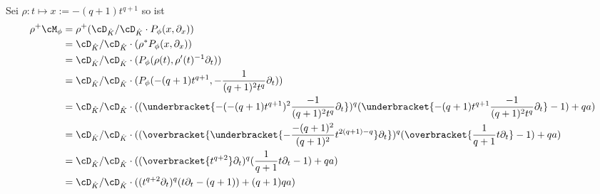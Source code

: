 Sei $\rho:t\mapsto x:=-(q+1) t^{q+1}$ so ist
\begin{align*}
\rho^+\cM_\phi &= \rho^+(\cD_{\hat K}/\cD_{\hat K}\cdot P_\phi(x,\partial_x))\\
  &=\cD_{\hat K}/\cD_{\hat K}\cdot(\rho^*P_\phi(x,\partial_x))\\
  &=\cD_{\hat K}/\cD_{\hat K}\cdot(P_\phi(\rho(t),\rho'(t)^{-1}\partial_t))\\
  &=\cD_{\hat K}/\cD_{\hat K}
    \cdot(P_\phi(-(q+1) t^{q+1},-\frac{1}{(q+1)^2t^q}\partial_t))\\
  &=\cD_{\hat K}/\cD_{\hat K} \cdot
    ((\underbracket{-(-(q+1) t^{q+1})^2\frac{-1}{(q+1)^2t^{q}}\partial_t})^{q}
    (\underbracket{-(q+1) t^{q+1}\frac{-1}{(q+1)^2t^{q}}\partial_t}-1)+qa)\\
  &=\cD_{\hat K}/\cD_{\hat K}
    \cdot((\overbracket{
      \underbracket{-\frac{-(q+1)^2}{(q+1)^2}t^{2(q+1)-q}}\partial_t})^{q}
    (\overbracket{\frac{1}{q+1}t\partial_t}-1)+qa)\\
  &=\cD_{\hat K}/\cD_{\hat K}
    \cdot((\overbracket{t^{q+2}}\partial_t)^{q}
    (\frac{1}{q+1}t\partial_t-1)+qa)\\
  &=\cD_{\hat K}/\cD_{\hat K}
    \cdot((t^{q+2}\partial_t)^{q}
    (t\partial_t-(q+1))+(q+1)qa)
\end{align*}
\begin{comment}
muss noch gezeigt werden, dass dies ein Meromorpher Zusammenhang???
\end{comment}
\begin{comment}
Bei \cite{sabbah_Fourier-local}:\\
Sei $\rho:t\mapsto x:=-\frac{t^{q+1}}{qa}$ so ist
\begin{align*}
\rho^+\cM_\phi &= \rho^+(\cD_{\hat K}/\cD_{\hat K}\cdot P_\phi(x,\partial_x))\\
  &=\cD_{\hat K}/\cD_{\hat K}\cdot(\rho^*P_\phi(x,\partial_x))\\
  &=\cD_{\hat K}/\cD_{\hat K}\cdot(P_\phi(\rho(t),\rho'(t)^{-1}\partial_t))\\
  &=\cD_{\hat K}/\cD_{\hat K}
    \cdot(P_\phi(-\frac{t^{q+1}}{qa}, -\frac{qa}{(q+1)t^q}\partial_t))
\end{align*}
mit
\begin{align*}
P_\phi(-\frac{t^{q+1}}{qa}, -\frac{qa}{(q+1)t^q}\partial_t)
  &= (-(-\frac{t^{q+1}}{qa})^2(-\frac{qa}{(q+1)t^q}\partial_t))^q
    (-\frac{t^{q+1}}{qa}(-\frac{qa}{(q+1)t^q}\partial_t)-1)+qa\\
  &= ((\frac{t^{q+1}}{qa})^2\frac{qa}{(q+1)t^q}\partial_t)^q
    (\frac{t^{q+1}}{qa}\frac{qa}{(q+1)t^q}\partial_t-1)+qa\\
  &= (\frac{(t^{q+1})^2}{qa(q+1)t^q}\partial_t)^q
    (\frac{t^{q+1}}{(q+1)t^q}\partial_t-1)+qa\\
  &= (\frac{t^{2q+2-q}}{qa(q+1)}\partial_t)^q
    (\frac{t^{q+1-q}}{(q+1)}\partial_t-1)+qa\\
  &= (\frac{t^{q+2}}{qa(q+1)}\partial_t)^q
    (\frac{1}{(q+1)}t\partial_t-1)+qa\\
\end{align*}
\end{comment}

